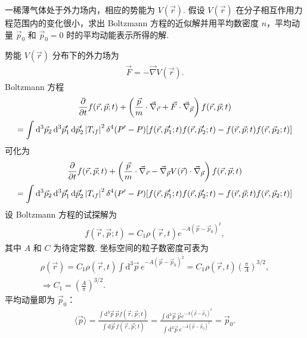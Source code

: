 \documentclass{assignment}
\begin{document}
\begin{prob}
    一稀薄气体处于外力场内，相应的势能为 $V(\vec{r})$. 假设 $V(\vec{r})$ 在分子相互作用力程范围内的变化很小，求出 Boltzmann 方程的近似解并用平均数密度 $n$，平均动量 $\vec{p}_0$ 和 $\vec{p}_0=0$ 时的平均动能表示所得的解.
\end{prob}
\begin{sol}
    势能 $V(\vec{r})$ 分布下的外力场为
    \begin{align}
        \vec{F}=-\vec{\nabla}V(\vec{r}).
    \end{align}
    Boltzmann 方程
    \begin{gather}
        \notag\frac{\partial}{\partial t}f(\vec{r},\vec{p};t)+\left(\frac{\vec{p}}{m}\cdot\vec{\nabla}_{\vec{r}}+\vec{F}\cdot\vec{\nabla}_{\vec{p}}\right)f(\vec{r},\vec{p};t)\\
        =\int\mathrm{d}^3\vec{p}_2\,\mathrm{d}^3\vec{p}_1'\,\mathrm{d}\vec{p}_2'\left\lvert T_{if}\right\rvert^2\delta^4(P'-P)[f(\vec{r},\vec{p}_1';t)f(\vec{r},\vec{p}_2';t)-f(\vec{r},\vec{p};t)f(\vec{r},\vec{p}_2;t)]
    \end{gather}
    可化为
    \begin{gather}
        \notag\frac{\partial}{\partial t}f(\vec{r},\vec{p};t)+\left(\frac{\vec{p}}{m}\cdot\vec{\nabla}_{\vec{r}}-\vec{\nabla}_{\vec{p}}V(\vec{r})\cdot\vec{\nabla}_{\vec{p}}\right)f(\vec{r},\vec{p};t)\\
        =\int\mathrm{d}^3\vec{p}_2\,\mathrm{d}^3\vec{p}_1'\,\mathrm{d}\vec{p}_2'\left\lvert T_{if}\right\rvert^2\delta^4(P'-P)[f(\vec{r},\vec{p}_1';t)f(\vec{r},\vec{p}_2';t)-f(\vec{r},\vec{p};t)f(\vec{r},\vec{p}_2;t)]
    \end{gather}
    设 Boltzmann 方程的试探解为
    \begin{align}
        f(\vec{r},\vec{p};t)=C_1\rho(\vec{r},t)e^{-A(\vec{p}-\vec{p}_0)^2},
    \end{align}
    其中 $A$ 和 $C$ 为待定常数.
    坐标空间的粒子数密度可表为
    \begin{gather}
        \rho(\vec{r})=C_1\rho(\vec{r},t)\int\mathrm{d}^3\vec{p}\,e^{-A(\vec{p}-\vec{p}_0)^2}=C_1\rho(\vec{r},t)\left(\frac{\pi}{A}\right)^{3/2},\\
        \Longrightarrow C_1=\left(\frac{A}{\pi}\right)^{3/2}.
    \end{gather}
    平均动量即为 $\vec{p}_0$：
    \begin{align}
        \langle\vec{p}\rangle=\frac{\int\mathrm{d}^3\vec{p}\,\vec{p}f(\vec{r},\vec{p};t)}{\int\mathrm{d}\vec{p}\,f(\vec{r},\vec{p};t)}=\frac{\int\mathrm{d}^3\vec{p}\,\vec{p}e^{-A(\vec{p}-\vec{p}_0)^2}}{\int\mathrm{d}^3\vec{p}\,e^{-A(\vec{p}-\vec{p}_0)^2}}=\vec{p}_0.

\end{align}
\end{sol}
\end{document}
